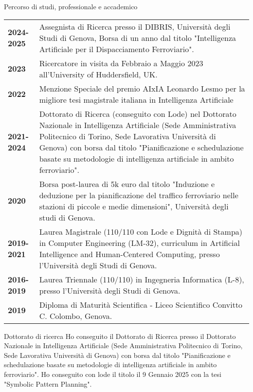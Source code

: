 \documentclass{resume} %
\begin{document}

\begin{rSection}{Percorso di studi, professionale e accademico}

\begin{tabularx}{0.95\textwidth} {lp{14cm}}
 \textbf{2024-2025} & Assegnista di Ricerca presso il DIBRIS, Università degli Studi di Genova, Borsa di un anno dal titolo "Intelligenza Artificiale per il Dispacciamento Ferroviario".  \\
 \textbf{2023}  & Ricercatore in visita da Febbraio a Maggio 2023 all'University of Huddersfield, UK.\\
  \textbf{2022}  & Menzione Speciale del premio AIxIA Leonardo Lesmo per la migliore tesi magistrale italiana in Intelligenza Artificiale\\
 \textbf{2021-2024}  & Dottorato di Ricerca (conseguito con Lode) nel Dottorato Nazionale in Intelligenza Artificiale (Sede Amministrativa Politecnico di Torino, Sede Lavorativa Università di Genova) con borsa dal titolo "Pianificazione e schedulazione basate su metodologie di intelligenza artificiale in ambito ferroviario".\\
 \textbf{2020} & Borsa post-laurea di 5k euro dal titolo "Induzione e deduzione per la pianificazione del traffico ferroviario nelle stazioni di piccole e medie dimensioni", Università degli studi di Genova. \\
 \textbf{2019-2021}  & Laurea Magistrale (110/110 con Lode e Dignità di Stampa) in Computer Engineering (LM-32), curriculum in Artificial Intelligence and Human-Centered Computing, presso l'Università degli Studi di Genova.  \\
 \textbf{2016-2019}  & Laurea Triennale (110/110) in Ingegneria Informatica (L-8), presso l'Università degli Studi di Genova. \\
 \textbf{2019}  & Diploma di Maturità Scientifica - Liceo Scientifico Convitto C. Colombo, Genova. 
\end{tabularx}
\end{rSection}
\begin{rSection}{Dottorato di ricerca}
	Ho conseguito il Dottorato di Ricerca presso il Dottorato Nazionale in Intelligenza Artificiale (Sede Amministrativa Politecnico di Torino, Sede Lavorativa Università di Genova) con borsa dal titolo "Pianificazione e schedulazione basate su metodologie di intelligenza artificiale in ambito ferroviario". Ho conseguito con lode il titolo il 9 Gennaio 2025 con la tesi "Symbolic Pattern Planning".
\end{rSection}
\end{document}
